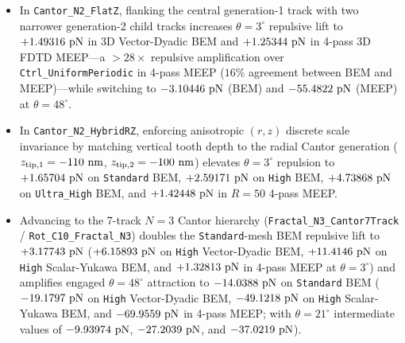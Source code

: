 \documentclass[11pt,letterpaper]{article}
\begin{document}
\begin{itemize}
    \item In \texttt{Cantor\_N2\_FlatZ}, flanking the central generation-1 track with two narrower generation-2 child tracks increases $\theta=3^\circ$ repulsive lift to $+1.49316{}\text{ pN}$ in 3D Vector-Dyadic BEM and $+1.25344{}\text{ pN}$ in 4-pass 3D FDTD MEEP---a $>28\times$ repulsive amplification over \texttt{Ctrl\_UniformPeriodic} in 4-pass MEEP ($16\%$ agreement between BEM and MEEP)---while switching to $-3.10446{}\text{ pN}$ (BEM) and $-55.4822{}\text{ pN}$ (MEEP) at $\theta=48^\circ$.
    \item In \texttt{Cantor\_N2\_HybridRZ}, enforcing anisotropic $(r,z)$ discrete scale invariance by matching vertical tooth depth to the radial Cantor generation ($z_{\rm tip,1} = -110\text{ nm}$, $z_{\rm tip,2} = -100\text{ nm}$) elevates $\theta=3^\circ$ repulsion to $+1.65704{}\text{ pN}$ on \texttt{Standard} BEM, $+2.59171{}\text{ pN}$ on \texttt{High} BEM, $+4.73868{}\text{ pN}$ on \texttt{Ultra\_High} BEM, and $+1.42448{}\text{ pN}$ in $R=50$ 4-pass MEEP.
    \item Advancing to the 7-track $N=3$ Cantor hierarchy (\texttt{Fractal\_N3\_Cantor7Track} / \texttt{Rot\_C10\_Fractal\_N3}) doubles the \texttt{Standard}-mesh BEM repulsive lift to $+3.17743{}\text{ pN}$ ($+6.15893{}\text{ pN}$ on \texttt{High} Vector-Dyadic BEM, $+11.4146{}\text{ pN}$ on \texttt{High} Scalar-Yukawa BEM, and $+1.32813{}\text{ pN}$ in 4-pass MEEP at $\theta=3^\circ$) and amplifies engaged $\theta=48^\circ$ attraction to $-14.0388{}\text{ pN}$ on \texttt{Standard} BEM ($-19.1797{}\text{ pN}$ on \texttt{High} Vector-Dyadic BEM, $-49.1218{}\text{ pN}$ on \texttt{High} Scalar-Yukawa BEM, and $-69.9559{}\text{ pN}$ in 4-pass MEEP; with $\theta=21^\circ$ intermediate values of $-9.93974{}\text{ pN}$, $-27.2039{}\text{ pN}$, and $-37.0219{}\text{ pN}$).
\end{itemize}
\end{document}
